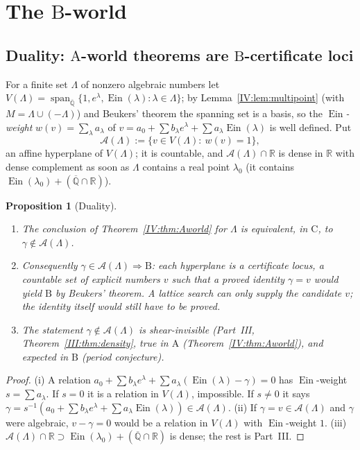 \documentclass[11pt,a4paper]{article}
\newcommand{\R}{\mathbb R}
\newcommand{\Qbar}{\overline{\mathbb Q}}
\newcommand{\Ein}{\operatorname{Ein}}
\newcommand{\Aff}{\mathcal A}
\DeclareMathOperator{\spn}{span}
\newtheorem{proposition}[theorem]{Proposition}
\theoremstyle{definition}
\theoremstyle{remark}
\numberwithin{equation}{section}
\begin{document}
\section{The $\mathrm B$-world}\label{IV:sec:B}

\subsection{Duality: $\mathrm A$-world theorems are $\mathrm B$-certificate loci}

For a finite set $\Lambda$ of nonzero algebraic numbers let
$V(\Lambda)=\spn_{\Qbar}\{1,e^\lambda,\Ein(\lambda):\lambda\in\Lambda\}$; by
Lemma~\ref{IV:lem:multipoint} (with $M=\Lambda\cup(-\Lambda)$) and Beukers' theorem the
spanning set is a basis, so the
\emph{$\Ein$-weight} $w(v)=\sum_\lambda a_\lambda$ of
$v=a_0+\sum b_\lambda e^\lambda+\sum a_\lambda\Ein(\lambda)$ is well defined. Put
\[
 \Aff(\Lambda):=\{v\in V(\Lambda):\ w(v)=1\},
\]
an affine hyperplane of $V(\Lambda)$; it is countable, and $\Aff(\Lambda)\cap\R$ is dense
in $\R$ with dense complement as soon as $\Lambda$ contains a real point $\lambda_0$ (it
contains $\Ein(\lambda_0)+(\Qbar\cap\R)$).

\begin{proposition}[Duality]\label{IV:prop:dual}
\begin{enumerate}[label=(\roman*)]
\item The conclusion of Theorem~\ref{IV:thm:Aworld} for $\Lambda$ is equivalent, in
$\mathrm C$, to $\gamma\notin\Aff(\Lambda)$.
\item Consequently $\gamma\in\Aff(\Lambda)\Rightarrow\mathrm B$: each hyperplane is a
\emph{certificate locus}, a countable set of explicit numbers $v$ such that a proved
identity $\gamma=v$ would yield $\mathrm B$ by Beukers' theorem. A lattice search can only
supply the candidate $v$; the identity itself would still have to be proved.
\item The statement $\gamma\notin\Aff(\Lambda)$ is shear-invisible (Part~III,
Theorem~\ref{III:thm:density}, true in $\mathrm A$ (Theorem~\ref{IV:thm:Aworld}), and expected in $\mathrm B$
(period conjecture).
\end{enumerate}
\end{proposition}
\begin{proof}
(i) A relation $a_0+\sum b_\lambda e^\lambda+\sum a_\lambda(\Ein(\lambda)-\gamma)=0$ has
$\Ein$-weight $s=\sum a_\lambda$. If $s=0$ it is a relation in $V(\Lambda)$, impossible. If
$s\ne0$ it says $\gamma=s^{-1}(a_0+\sum b_\lambda e^\lambda+\sum a_\lambda\Ein(\lambda))\in\Aff(\Lambda)$.
(ii) If $\gamma=v\in\Aff(\Lambda)$ and $\gamma$ were algebraic, $v-\gamma=0$ would be a
relation in $V(\Lambda)$ with $\Ein$-weight $1$. (iii) $\Aff(\Lambda)\cap\R\supset\Ein(\lambda_0)+(\Qbar\cap\R)$
is dense; the rest is Part~III.
\end{proof}
\end{document}
